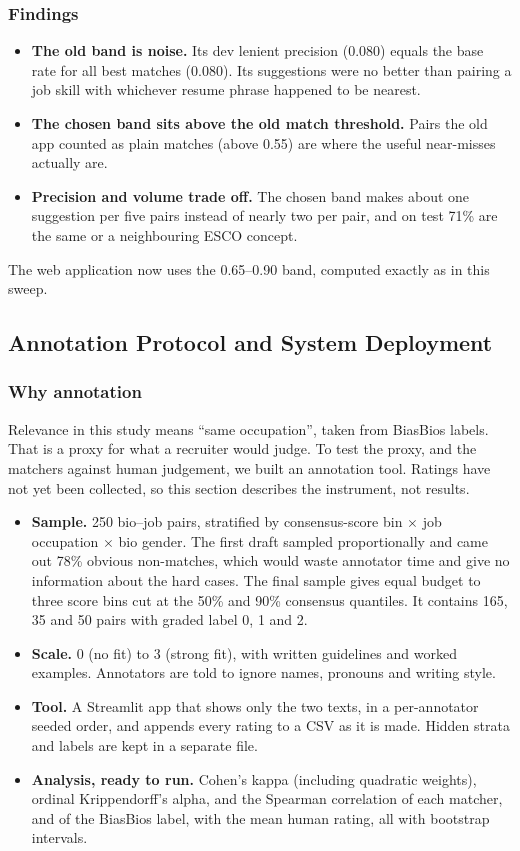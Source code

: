 \documentclass[conference,a4paper]{IEEEtran}
\begin{document}
\subsubsection{Findings} 

\begin{itemize}
\item \textbf{The old band is noise.} Its dev lenient precision (0.080) equals the base rate for all best matches (0.080). Its suggestions were no better than pairing a job skill with whichever resume phrase happened to be nearest.
\item \textbf{The chosen band sits above the old match threshold.} Pairs the old app counted as plain matches (above 0.55) are where the useful near-misses actually are.
\item \textbf{Precision and volume trade off.} The chosen band makes about one suggestion per five pairs instead of nearly two per pair, and on test 71\% are the same or a neighbouring ESCO concept.
\end{itemize}
The web application now uses the 0.65–0.90 band, computed exactly as in this sweep.

\subsection{Annotation Protocol and System Deployment}
\subsubsection{Why annotation} Relevance in this study means ``same occupation'', taken from BiasBios labels. That is a proxy for what a recruiter would judge. To test the proxy, and the matchers against human judgement, we built an annotation tool. Ratings have not yet been collected, so this section describes the instrument, not results.

\begin{itemize}
\item \textbf{Sample.} 250 bio–job pairs, stratified by consensus-score bin $\times$ job occupation $\times$ bio gender. The first draft sampled proportionally and came out 78\% obvious non-matches, which would waste annotator time and give no information about the hard cases. The final sample gives equal budget to three score bins cut at the 50\% and 90\% consensus quantiles. It contains 165, 35 and 50 pairs with graded label 0, 1 and 2.
\item \textbf{Scale.} 0 (no fit) to 3 (strong fit), with written guidelines and worked examples. Annotators are told to ignore names, pronouns and writing style.
\item \textbf{Tool.} A Streamlit app that shows only the two texts, in a per-annotator seeded order, and appends every rating to a CSV as it is made. Hidden strata and labels are kept in a separate file.
\item \textbf{Analysis, ready to run.} Cohen's kappa (including quadratic weights), ordinal Krippendorff's alpha, and the Spearman correlation of each matcher, and of the BiasBios label, with the mean human rating, all with bootstrap intervals.
\end{itemize}
\end{document}
